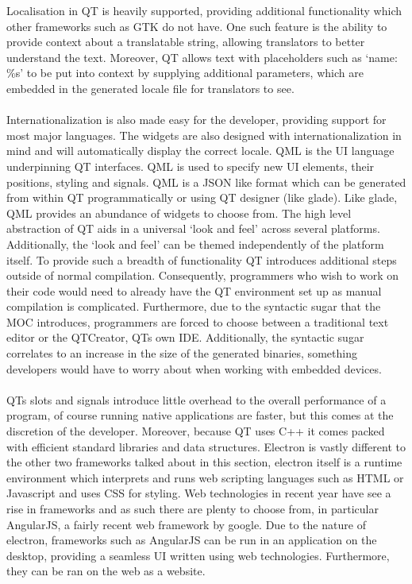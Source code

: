   Localisation in QT is heavily supported, providing additional functionality which other frameworks such as GTK do not have\cite{qt_localisation}. One such feature is the ability to provide context about a translatable string, allowing translators to better understand the text. Moreover, QT allows text with placeholders such as `name: \%s' to be put into context by supplying additional parameters, which are embedded in the generated locale file for translators to see. \\\\
  Internationalization is also made easy for the developer, providing support for most major languages\cite{qt_international}. The widgets are also designed with internationalization in mind and will automatically display the correct locale.
  QML is the UI language underpinning QT interfaces\cite{qt_qml}. QML is used to specify new UI elements, their positions, styling and signals. QML is a JSON like format which can be generated from within QT programmatically or using QT designer (like glade). Like glade, QML provides an abundance of widgets to choose from. The high level abstraction of QT aids in a universal `look and feel' across several platforms. Additionally, the `look and feel' can be themed independently of the platform itself.
  To provide such a breadth of functionality QT introduces additional steps outside of normal compilation. Consequently, programmers who wish to work on their code would need to already have the QT environment set up as manual compilation is complicated. Furthermore, due to the syntactic sugar that the MOC introduces, programmers are forced to choose between a traditional text editor or the QTCreator, QTs own IDE. Additionally,
  the syntactic sugar correlates to an increase in the size of the generated binaries, something developers would have to worry about when working with embedded devices.\\\\
  QTs slots and signals introduce little overhead to the overall performance of a program, of course running native applications are faster, but this comes at the discretion of the developer. Moreover, because QT uses C++ it comes packed with efficient standard libraries and data structures.
Electron is vastly different to the other two frameworks talked about in this section, electron itself is a runtime environment which interprets and runs web scripting languages such as HTML or Javascript and uses CSS for styling. Web technologies in recent year have see a rise in frameworks and as such there are plenty to choose from, in particular AngularJS, a fairly recent web framework by google. Due to the nature of electron, frameworks such as AngularJS can be run in an application on the desktop, providing a seamless UI written using web technologies. Furthermore, they can be ran on the web as a website.
